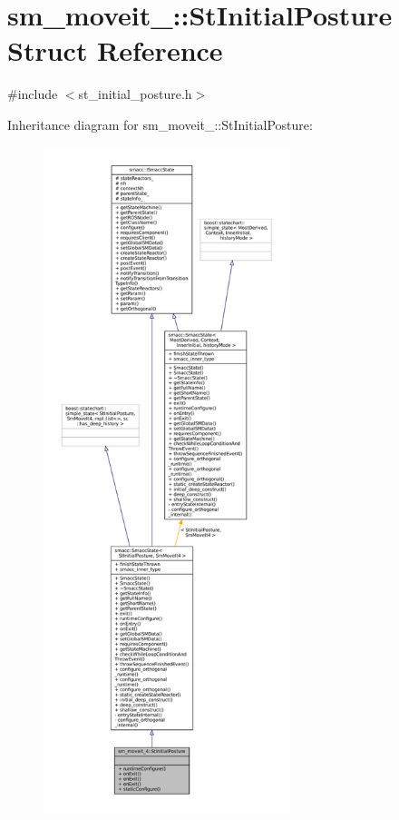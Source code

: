 \hypertarget{structsm__moveit__4_1_1StInitialPosture}{}\section{sm\+\_\+moveit\+\_\+:\+:St\+Initial\+Posture Struct Reference}
\label{structsm__moveit__4_1_1StInitialPosture}


{\ttfamily \#include $<$st\+\_\+initial\+\_\+posture.\+h$>$}



Inheritance diagram for sm\+\_\+moveit\+\_\+:\+:St\+Initial\+Posture\+:
\nopagebreak
\begin{figure}[H]
\begin{center}
\leavevmode
\includegraphics[height=550pt]{structsm__moveit__4_1_1StInitialPosture__inherit__graph}
\end{center}
\end{figure}


